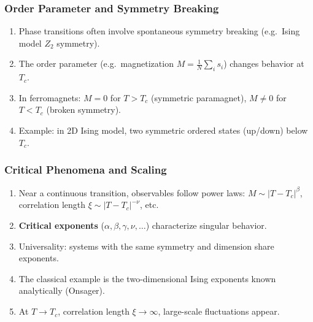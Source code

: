 \documentclass{beamer}
\begin{document}
\begin{frame}
\frametitle{Order Parameter and Symmetry Breaking}

\begin{enumerate}
\item Phase transitions often involve spontaneous symmetry breaking (e.g.\ Ising model $Z_2$ symmetry).

\item The order parameter (e.g.\ magnetization $M = \frac{1}{N}\sum_i s_i$) changes behavior at $T_c$.

\item In ferromagnets: $M=0$ for $T>T_c$ (symmetric paramagnet), $M\neq 0$ for $T<T_c$ (broken symmetry).

\item Example: in 2D Ising model, two symmetric ordered states (up/down) below $T_c$.
\end{enumerate}

\noindent
\end{frame}

\begin{frame}
\frametitle{Critical Phenomena and Scaling}

\begin{enumerate}
\item Near a continuous transition, observables follow power laws: $M \sim |T-T_c|^\beta$, correlation length $\xi \sim |T-T_c|^{-\nu}$, etc.

\item \textbf{Critical exponents} ($\alpha,\beta,\gamma,\nu,\dots$) characterize singular behavior.

\item Universality: systems with the same symmetry and dimension share exponents.

\item The classical example is the  two-dimensional  Ising exponents known analytically (Onsager).

\item At $T\to T_c$, correlation length $\xi\to\infty$, large-scale fluctuations appear.
\end{enumerate}

\noindent
\end{frame}
\end{document}
